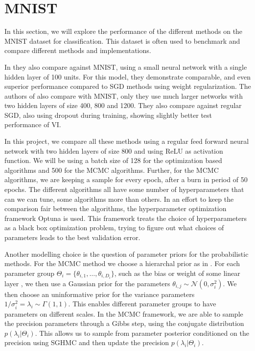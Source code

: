 \section{MNIST}
In this section, we will explore the performance of the different methods on the MNIST dataset for classification. 
This dataset is often used to benchmark and compare different methods and implementations. 

In \cite{chen_stochastic_2014} they also compare against MNIST, using a small neural network with a single hidden layer of 100 units.
For this model, they demonstrate comparable, and even superior performance compared to SGD methods using weight regularization.
The authors of \cite{blundell_weight_2015} also compare with MNIST, only they use much larger networks with two hidden layers of size 400, 800 and 1200. 
They also compare against regular SGD, also using dropout during training, showing slightly better test performance of VI.

In this project, we compare all these methods using a regular feed forward neural network with two hidden layers of size 800 and using ReLU as activation function. 
We will be using a batch size of 128 for the optimization based algorithms and 500 for the MCMC algorithms.
Further, for the MCMC algorithms, we are keeping a sample for every epoch, after a burn in period of 50 epochs.
The different algorithms all have some number of  hyperparameters that can we can tune, some algorithms more than others.
In an effort to keep the comparison fair between the algorithms, the hyperparameter optimization framework Optuna \cite{akiba_optuna_2019} is used. 
This framework treats the choice of hyperparameters as a black box optimization problem, trying to figure out what choices of parameters leads to the best validation error.

Another modelling choice is the question of parameter priors for the probabilistic methods. 
For the MCMC method we choose a hierarchal prior as in \cite{chen_stochastic_2014}. 
For each parameter group $\Theta_i=\{\theta_{i,1},\dots,\theta_{i,D_i}\}$, such as the bias or weight of some linear layer , we then use a Gaussian prior for the parameters $\theta_{i,j} \sim  \mathcal{N}(0, \sigma_i^2)$.
We then choose an uninformative prior for the variance parameters $1/\sigma_i^2 = \lambda_i \sim \Gamma(1,1)$.
This enables different parameter groups to have parameters on different scales.
In the MCMC framework, we are able to sample the precision parameters through a Gibbs step, using the conjugate distribution $p(\lambda_i | \Theta_i)$.
This allows us to sample from parameter posterior conditioned on the precision using SGHMC and then update the precision $p(\lambda_i | \Theta_i)$.

